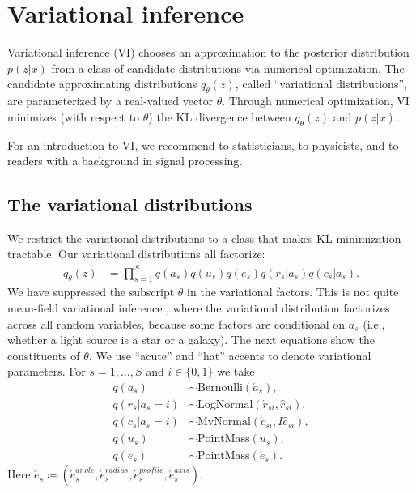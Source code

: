 \section{Variational inference}
\label{sec:vi}

Variational inference (VI) chooses an approximation to the posterior
distribution $p(z | x)$ from a class of candidate distributions via numerical optimization.
The candidate approximating distributions $q_\theta(z)$, called ``variational distributions'', are parameterized by a real-valued vector $\theta$.
Through numerical optimization, VI minimizes (with respect to $\theta$) the KL divergence between $q_\theta(z)$ and $p(z|x)$.

For an introduction to VI, we recommend
\cite{blei2017variational} to statisticians,
\cite{mackay1995developments} to physicists, and
\cite{smidl2006variational} to readers with a background in signal processing.


\subsection{The variational distributions}
\label{vi_dist}

We restrict the variational distributions to a class that makes KL minimization tractable.
Our variational distributions all factorize:
\begin{align}
q_\theta(z) &=\prod_{s=1}^{S} q(a_{s}) q(u_{s}) q(e_{s}) q(r_{s}|a_{s}) q(c_{s}|a_{s}).\label{eq:q_factorization}
\end{align}
We have suppressed the subscript $\theta$ in the variational factors.
This is not quite mean-field variational inference \citep{blei2017variational},
where the variational distribution factorizes across all random variables,
because some factors are conditional on $a_s$ (i.e., whether a light source is a star or a galaxy).
The next equations show the constituents of $\theta$.
We use ``acute'' and ``hat'' accents to denote variational parameters.
For $s=1,\ldots,S$ and $i\in\{0,1\}$ we take
\begin{align}
q(a_{s}) & \sim\mathrm{Bernoulli}\left( \acute a_s \right),\label{eq0}\\
q\left(r_{s}|a_{s}=i\right) & \sim\mathrm{LogNormal}\left( \acute r_{si}, \hat r_{si}\right),\\
q\left(c_{s}|a_{s}=i\right) & \sim\mathrm{MvNormal}\left( \acute c_{si}, I \hat c_{si}\right),\\
q\left(u_{s}\right) & \sim\mathrm{PointMass}\left( \acute u_s \right),\\
q\left(e_{s}\right) & \sim\mathrm{PointMass}\left( \acute e_s \right).\label{eq1}
\end{align}
Here $\acute e_s \coloneqq (\acute e_s^{angle}, \acute e_s^{radius}, \acute e_s^{profile}, \acute e_s^{axis})$.


